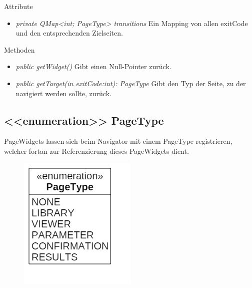 Attribute
\begin{itemize}
	\item\textit{private QMap<int; PageType> transitions}
	Ein Mapping von allen exitCode und den entsprechenden Zielseiten.
\end{itemize}

Methoden
\begin{itemize}
	\item\textit{public getWidget()}
	Gibt einen Null-Pointer zurück.
	\item\textit{public getTarget(in exitCode:int): PageType}
	Gibt den Typ der Seite, zu der navigiert werden sollte, zurück.
\end{itemize}

\subsection*{<<enumeration>> PageType}
PageWidgets lassen sich beim Navigator mit einem PageType registrieren, welcher fortan zur Referenzierung dieses PageWidgets dient.

\begin{figure}[H]
\centering
\includegraphics[scale=0.5]{img/Klassendiagramm/Klassen/Controller/PageType}
\label{fig:pageType}
\end{figure}